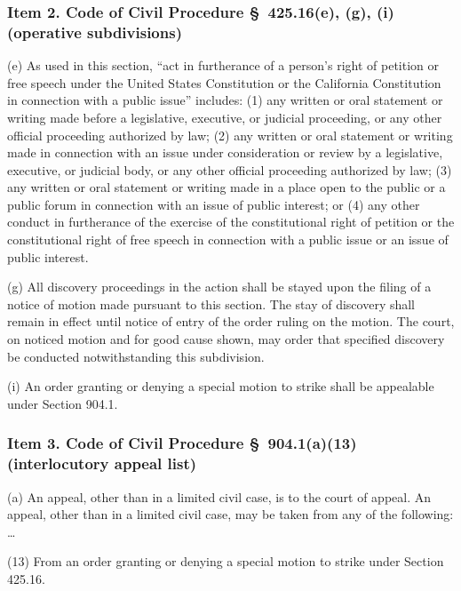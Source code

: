 \subsubsection*{Item 2. Code of Civil Procedure \S~425.16(e), (g), (i) (operative subdivisions)}

\begin{quoting}
\noindent (e) As used in this section, ``act in furtherance of a person's right of petition or free speech under the United States Constitution or the California Constitution in connection with a public issue'' includes: (1) any written or oral statement or writing made before a legislative, executive, or judicial proceeding, or any other official proceeding authorized by law; (2) any written or oral statement or writing made in connection with an issue under consideration or review by a legislative, executive, or judicial body, or any other official proceeding authorized by law; (3) any written or oral statement or writing made in a place open to the public or a public forum in connection with an issue of public interest; or (4) any other conduct in furtherance of the exercise of the constitutional right of petition or the constitutional right of free speech in connection with a public issue or an issue of public interest.

\noindent (g) All discovery proceedings in the action shall be stayed upon the filing of a notice of motion made pursuant to this section. The stay of discovery shall remain in effect until notice of entry of the order ruling on the motion. The court, on noticed motion and for good cause shown, may order that specified discovery be conducted notwithstanding this subdivision.

\noindent (i) An order granting or denying a special motion to strike shall be appealable under Section 904.1.
\end{quoting}

\subsubsection*{Item 3. Code of Civil Procedure \S~904.1(a)(13) (interlocutory appeal list)}

\begin{quoting}
\noindent (a) An appeal, other than in a limited civil case, is to the court of appeal. An appeal, other than in a limited civil case, may be taken from any of the following: \dots

\noindent (13) From an order granting or denying a special motion to strike under Section 425.16.
\end{quoting}

